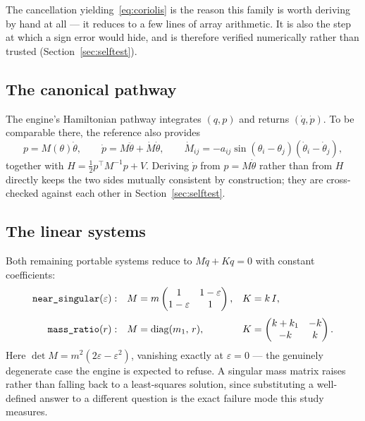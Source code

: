 \documentclass[11pt,a4paper]{article}
\begin{document}
The cancellation yielding~\eqref{eq:coriolis} is the reason this family is
worth deriving by hand at all --- it reduces to a few lines of array
arithmetic. It is also the step at which a sign error would hide, and is
therefore verified numerically rather than trusted (Section~\ref{sec:selftest}).

\subsection{The canonical pathway}

The engine's Hamiltonian pathway integrates $(q,p)$ and returns
$(\dot q,\dot p)$. To be comparable there, the reference also provides
\begin{equation}
p = M(\theta)\dot\theta, \qquad
\dot p = M\ddot\theta + \dot M\dot\theta, \qquad
\dot M_{ij} = -a_{ij}\sin(\theta_i-\theta_j)(\dot\theta_i - \dot\theta_j),
\end{equation}
together with $H = \tfrac12 p^{\top}M^{-1}p + V$. Deriving $\dot p$ from
$p = M\dot\theta$ rather than from $H$ directly keeps the two sides mutually
consistent by construction; they are cross-checked against each other in
Section~\ref{sec:selftest}.

\subsection{The linear systems}

Both remaining portable systems reduce to $M\ddot q + Kq = 0$ with constant
coefficients:
\begin{align}
\text{\texttt{near\_singular}}(\varepsilon):\quad
  & M = m\begin{pmatrix}1 & 1-\varepsilon\\ 1-\varepsilon & 1\end{pmatrix},
  & K &= k\,I, \\[0.3em]
\text{\texttt{mass\_ratio}}(r):\quad
  & M = \operatorname{diag}(m_1,\,r),
  & K &= \begin{pmatrix}k+k_1 & -k\\ -k & k\end{pmatrix}.
\end{align}
Here $\det M = m^{2}(2\varepsilon - \varepsilon^{2})$, vanishing exactly at
$\varepsilon = 0$ --- the genuinely degenerate case the engine is expected to
refuse. A singular mass matrix raises rather than falling back to a
least-squares solution, since substituting a well-defined answer to a different
question is the exact failure mode this study measures.
\end{document}
